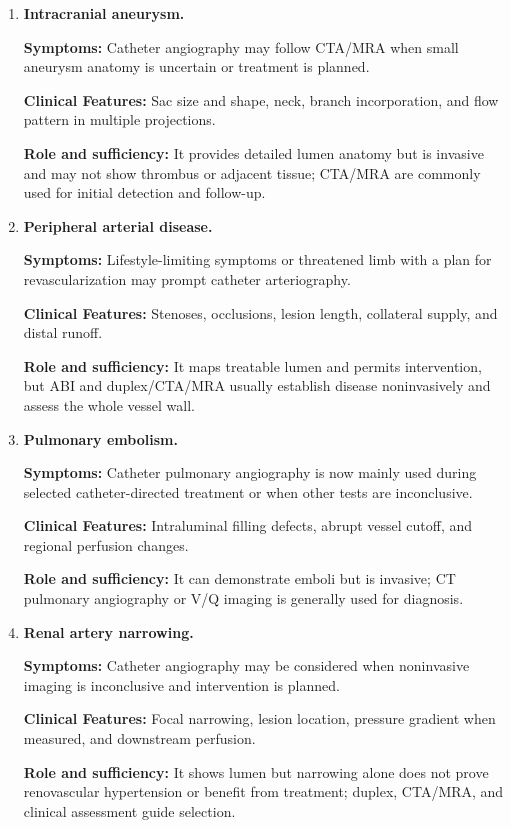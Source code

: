 \begin{enumerate}[leftmargin=*,itemsep=0.45em,topsep=0.4em]
\item \textbf{Intracranial aneurysm.}\par\noindent\textbf{Symptoms:} Catheter angiography may follow CTA/MRA when small aneurysm anatomy is uncertain or treatment is planned.\par\noindent\textbf{Clinical Features:} Sac size and shape, neck, branch incorporation, and flow pattern in multiple projections.\par\noindent\textbf{Role and sufficiency:} It provides detailed lumen anatomy but is invasive and may not show thrombus or adjacent tissue; CTA/MRA are commonly used for initial detection and follow-up.
\item \textbf{Peripheral arterial disease.}\par\noindent\textbf{Symptoms:} Lifestyle-limiting symptoms or threatened limb with a plan for revascularization may prompt catheter arteriography.\par\noindent\textbf{Clinical Features:} Stenoses, occlusions, lesion length, collateral supply, and distal runoff.\par\noindent\textbf{Role and sufficiency:} It maps treatable lumen and permits intervention, but ABI and duplex/CTA/MRA usually establish disease noninvasively and assess the whole vessel wall.
\item \textbf{Pulmonary embolism.}\par\noindent\textbf{Symptoms:} Catheter pulmonary angiography is now mainly used during selected catheter-directed treatment or when other tests are inconclusive.\par\noindent\textbf{Clinical Features:} Intraluminal filling defects, abrupt vessel cutoff, and regional perfusion changes.\par\noindent\textbf{Role and sufficiency:} It can demonstrate emboli but is invasive; CT pulmonary angiography or V/Q imaging is generally used for diagnosis.
\item \textbf{Renal artery narrowing.}\par\noindent\textbf{Symptoms:} Catheter angiography may be considered when noninvasive imaging is inconclusive and intervention is planned.\par\noindent\textbf{Clinical Features:} Focal narrowing, lesion location, pressure gradient when measured, and downstream perfusion.\par\noindent\textbf{Role and sufficiency:} It shows lumen but narrowing alone does not prove renovascular hypertension or benefit from treatment; duplex, CTA/MRA, and clinical assessment guide selection.

\end{enumerate}
